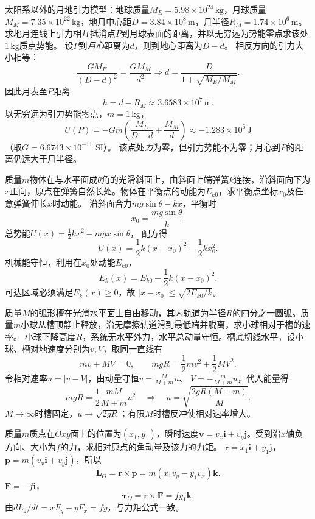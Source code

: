 \problemtext 太阳系以外的月地引力模型：地球质量$M_E=5.98\times10^{24}\,\mathrm{kg}$，月球质量$M_M=7.35\times10^{22}\,\mathrm{kg}$，地月中心距$D=3.84\times10^8\,\mathrm m$，月半径$R_M=1.74\times10^6\,\mathrm m$。
求地月连线上引力相互抵消点$P$到月球表面的距离，并以无穷远为势能零点求该处$1\,\mathrm{kg}$质点势能。
\workings
设$P$到\emph{月心}距离为$d$，则到地心距离为$D-d$。
相反方向的引力大小相等：
\[
\frac{GM_E}{(D-d)^2}=\frac{GM_M}{d^2}
\Longrightarrow d=\frac{D}{1+\sqrt{M_E/M_M}}.
\]
因此月表至$P$距离
\[
\boxed{h=d-R_M\approx3.6583\times10^7\,\mathrm m}.
\]
以无穷远为引力势能零点，$m=1\,\mathrm{kg}$，
\[
\boxed{U(P)=-Gm\left(\frac{M_E}{D-d}+\frac{M_M}{d}\right)
\approx-1.283\times10^6\,\mathrm J}
\]
（取$G=6.6743\times10^{-11}$ SI）。
\crosscheck 该点处\emph{力}为零，但引力势能不为零；月心到$P$的距离仍远大于月半径。

\problemtext 质量$m$物体在与水平面成$\theta$角的光滑斜面上，由斜面上端弹簧$k$连接，沿斜面向下为$x$正向，原点在弹簧自然长处。物体在平衡点的动能为$E_{k0}$，求平衡点坐标$x_0$及任意弹簧伸长$x$时动能。
\workings
沿斜面合力$mg\sin\theta-kx$，平衡时
\[
\boxed{x_0=\frac{mg\sin\theta}{k}}.
\]
总势能$U(x)=\frac12kx^2-mgx\sin\theta$，
配方得
\[
U(x)=\frac12k(x-x_0)^2-\frac12kx_0^2.
\]
机械能守恒，利用在$x_0$处动能$E_{k0}$，
\[
\boxed{E_k(x)=E_{k0}-\frac12k(x-x_0)^2}.
\]
\crosscheck 可达区域必须满足$E_k(x)\ge0$，故
$|x-x_0|\le\sqrt{2E_{k0}/k}$。

\problemtext 质量$M$的弧形槽在光滑水平面上自由移动，其内轨道为半径$R$的四分之一圆弧。质量$m$小球从槽顶静止释放，沿无摩擦轨道滑到最低端并脱离，求小球相对于槽的速率。
\workings
小球下降高度$R$，系统无水平外力，水平总动量守恒。槽底切线水平，设小球、槽对地速度分别为$v,V$，取同一直线有
\[
mv+MV=0,\qquad
mgR=\frac12mv^2+\frac12MV^2.
\]
令相对速率$u=|v-V|$，由动量守恒$v=\frac{M}{M+m}u$、
$V=-\frac{m}{M+m}u$，代入能量得
\[
mgR=\frac12\frac{mM}{M+m}u^2
\quad\Longrightarrow\quad
\boxed{u=\sqrt{\frac{2gR(M+m)}{M}}}.
\]
\crosscheck $M\to\infty$时槽固定，$u\to\sqrt{2gR}$；有限$M$时槽反冲使相对速率增大。

\problemtext 质量$m$质点在$Oxy$面上的位置为$(x_1,y_1)$，瞬时速度$\bm v=v_x\bm i+v_y\bm j$。受到沿$x$轴负方向、大小为$f$的力，求相对原点的角动量及该力的力矩。
\workings
$\bm r=x_1\bm i+y_1\bm j$，$\bm p=m(v_x\bm i+v_y\bm j)$，所以
\[
\boxed{\bm L_O=\bm r\times\bm p
=m(x_1v_y-y_1v_x)\bm k}.
\]
$\bm F=-f\bm i$，
\[
\boxed{\bm\tau_O=\bm r\times\bm F=f y_1\bm k}.
\]
\crosscheck 由$dL_z/dt=xF_y-yF_x=f y$，与力矩公式一致。


